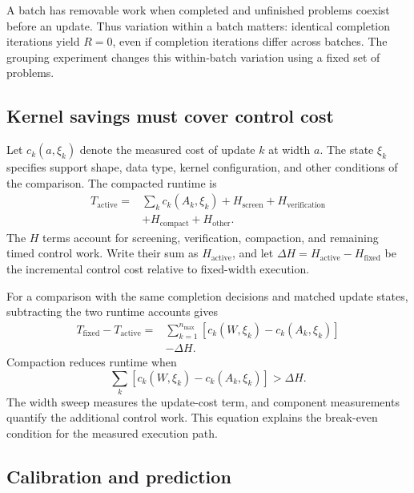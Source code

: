 A batch has removable work when completed and unfinished problems coexist before an update. Thus variation within a batch matters: identical completion iterations yield $R=0$, even if completion iterations differ across batches. The grouping experiment changes this within-batch variation using a fixed set of problems.

\subsection{Kernel savings must cover control cost}

Let $c_k(a,\xi_k)$ denote the measured cost of update $k$ at width $a$. The state $\xi_k$ specifies support shape, data type, kernel configuration, and other conditions of the comparison. The compacted runtime is
\begin{equation}
\begin{split}
T_{\mathrm{active}}={}&\sum_k c_k(A_k,\xi_k)
+H_{\mathrm{screen}}+H_{\mathrm{verification}}\\
&+H_{\mathrm{compact}}+H_{\mathrm{other}}.
\end{split}
\label{eq:time-accounting}
\end{equation}
The $H$ terms account for screening, verification, compaction, and remaining timed control work. Write their sum as $H_{\mathrm{active}}$, and let $\Delta H=H_{\mathrm{active}}-H_{\mathrm{fixed}}$ be the incremental control cost relative to fixed-width execution.

For a comparison with the same completion decisions and matched update states, subtracting the two runtime accounts gives
\begin{equation}
\begin{split}
T_{\mathrm{fixed}}-T_{\mathrm{active}}
={}&\sum_{k=1}^{n_{\max}}
[c_k(W,\xi_k)-c_k(A_k,\xi_k)]\\
&-\Delta H.
\end{split}
\label{eq:time-difference}
\end{equation}
Compaction reduces runtime when
\begin{equation}
\sum_k[c_k(W,\xi_k)-c_k(A_k,\xi_k)]>\Delta H.
\label{eq:active-gate}
\end{equation}
The width sweep measures the update-cost term, and component measurements quantify the additional control work. This equation explains the break-even condition for the measured execution path.

\subsection{Calibration and prediction}

